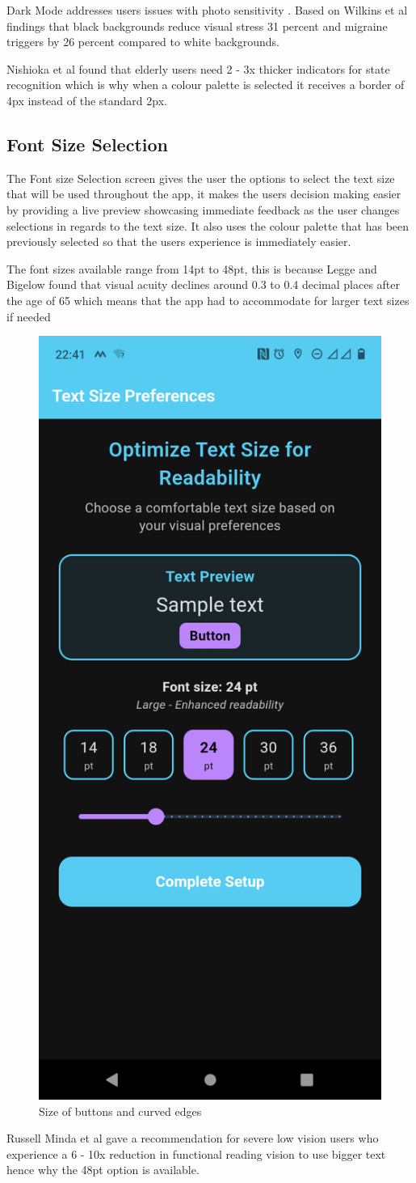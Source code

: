 \documentclass[]{project_final}
\begin{document}

Dark Mode addresses users issues with photo sensitivity . Based on Wilkins et al findings that black backgrounds reduce visual stress 31 percent and migraine triggers by 26 percent compared to white backgrounds.


Nishioka et al found that elderly users need 2 - 3x thicker indicators for state recognition which is why when a colour palette is selected it receives a border of 4px instead of the standard 2px.


\subsection{Font Size Selection}
The Font size Selection screen gives the user the options to select the text size that will be used throughout the app, it makes the users decision making easier by providing a live preview showcasing immediate feedback as the user changes selections in regards to the text size. It also uses the colour palette that has been previously selected so that the users experience is immediately easier.

The font sizes available range from 14pt to 48pt, this is because Legge and Bigelow found that visual acuity declines around 0.3 to 0.4 decimal places after the age of 65 which means that the app had to accommodate for larger text sizes if needed

\begin{figure}[ht!]
  \centering
  \includegraphics[height=0.3\textwidth]{M Font Size.png}
  \caption{Size of buttons and curved edges}
  \label{fig:1}
\end{figure}

\newpage
Russell Minda et al gave a recommendation for severe low vision users who experience a 6 - 10x reduction in functional reading vision to use bigger text hence why the 48pt option is available.
\end{document}
